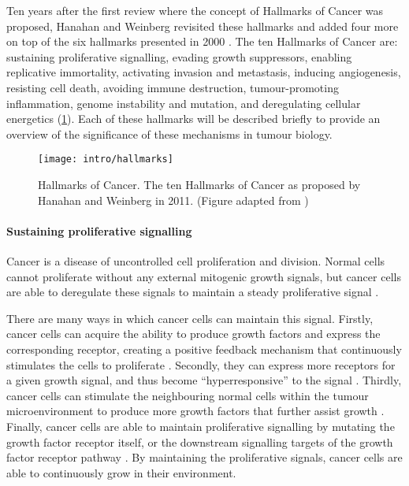 Ten years after the first review where the concept of Hallmarks of Cancer was proposed, Hanahan and Weinberg revisited these hallmarks and added four more on top of the six hallmarks presented in 2000 \citep{Hanahan2011}.
The ten Hallmarks of Cancer are: sustaining proliferative signalling, evading growth suppressors, enabling replicative immortality, activating invasion and metastasis, inducing angiogenesis, resisting cell death, avoiding immune destruction, tumour-promoting inflammation, genome instability and mutation, and deregulating cellular energetics (\cref{fig:hallmarks}).
Each of these hallmarks will be described briefly to provide an overview of the significance of these mechanisms in tumour biology.

\begin{figure}[htb!]
	\centering
	\texttt{[image: intro/hallmarks]}
	\caption[Hallmarks of Cancer]{Hallmarks of Cancer. The ten Hallmarks of Cancer as proposed by Hanahan and Weinberg in 2011. (Figure adapted from \citet{Hanahan2011})}
	\label{fig:hallmarks}
\end{figure}

\paragraph{Sustaining proliferative signalling}

\noindent
Cancer is a disease of uncontrolled cell proliferation and division.
Normal cells cannot proliferate without any external mitogenic growth signals, but cancer cells are able to deregulate these signals to maintain a steady proliferative signal \citep{Hanahan2011}.

There are many ways in which cancer cells can maintain this signal.
Firstly, cancer cells can acquire the ability to produce growth factors and express the corresponding receptor, creating a positive feedback mechanism that continuously stimulates the cells to proliferate \citep{Hanahan2000}.
Secondly, they can express more receptors for a given growth signal, and thus become ``hyperresponsive'' to the signal \citep{Hanahan2000,Hanahan2011}.
Thirdly, cancer cells can stimulate the neighbouring normal cells within the tumour microenvironment to produce more growth factors that further assist growth \citep{Bhowmick2004, Liotta2001, Wiseman2002}.
Finally, cancer cells are able to maintain proliferative signalling by mutating the growth factor receptor itself, or the downstream signalling targets of the growth factor receptor pathway \citep{Fuqua1991,SuHuang1997,Satyamoorthy2003}.
By maintaining the proliferative signals, cancer cells are able to continuously grow in their environment.

